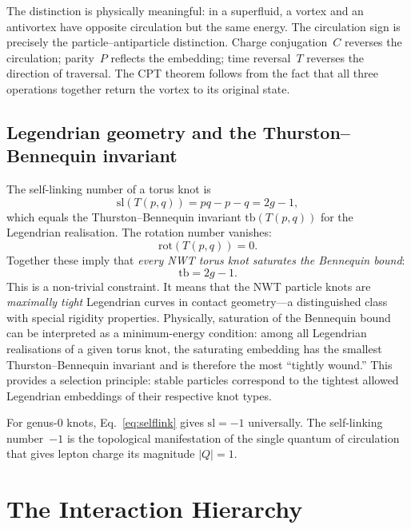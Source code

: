 \documentclass[11pt,a4paper]{article}
\begin{document}
The distinction is physically meaningful: in a superfluid,
a vortex and an antivortex have opposite circulation but the
same energy.  The circulation sign is precisely the
particle--antiparticle distinction.  Charge conjugation~$C$
reverses the circulation; parity~$P$ reflects the embedding;
time reversal~$T$ reverses the direction of traversal.
The CPT theorem follows from the fact that all three
operations together return the vortex to its original state.

\subsection{Legendrian geometry and the Thurston--Bennequin invariant}

The self-linking number of a torus knot is
\begin{equation}
  \mathrm{sl}(T(p,q)) = pq - p - q = 2g - 1,
  \label{eq:selflink}
\end{equation}
which equals the Thurston--Bennequin invariant
$\mathrm{tb}(T(p,q))$ for the Legendrian realisation.
The rotation number vanishes:
\begin{equation}
  \mathrm{rot}(T(p,q)) = 0.
  \label{eq:rot}
\end{equation}
Together these imply that \emph{every NWT torus knot saturates
the Bennequin bound}:
\begin{equation}
  \mathrm{tb} = 2g - 1.
  \label{eq:bennequin}
\end{equation}
This is a non-trivial constraint.  It means that the NWT
particle knots are \emph{maximally tight} Legendrian curves
in contact geometry---a distinguished class with special
rigidity properties.  Physically, saturation of the Bennequin
bound can be interpreted as a minimum-energy condition: among
all Legendrian realisations of a given torus knot, the
saturating embedding has the smallest Thurston--Bennequin
invariant and is therefore the most ``tightly wound.''
This provides a selection principle: stable particles
correspond to the tightest allowed Legendrian embeddings
of their respective knot types.

For genus-0 knots, Eq.~\eqref{eq:selflink} gives
$\mathrm{sl} = -1$ universally.  The self-linking number~$-1$
is the topological manifestation of the single quantum of
circulation that gives lepton charge its magnitude $|Q| = 1$.


\section{The Interaction Hierarchy}
\label{sec:interactions}
\end{document}
